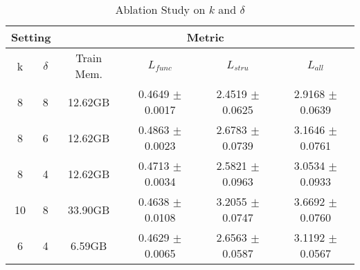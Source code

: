 \begin{table}[h]
\centering
\caption{Ablation Study on $k$ and $\delta$}
\begin{tabular}{@{}cc|cccc@{}}
\toprule
\multicolumn{2}{c|}{Setting} & \multicolumn{4}{c}{Metric} \\ \midrule
k & $\delta$ & Train Mem. & $L_{func}$ & $L_{stru}$ & $L_{all}$ \\ \midrule
8 & 8 & 12.62GB & 0.4649 $\pm$ 0.0017 & 2.4519 $\pm$ 0.0625 & 2.9168 $\pm$ 0.0639 \\
8 & 6 & 12.62GB & 0.4863 $\pm$ 0.0023 & 2.6783 $\pm$ 0.0739 & 3.1646 $\pm$ 0.0761 \\
8 & 4 & 12.62GB & 0.4713 $\pm$ 0.0034 & 2.5821 $\pm$ 0.0963 & 3.0534 $\pm$ 0.0933 \\
10 & 8 & 33.90GB & 0.4638 $\pm$ 0.0108 & 3.2055 $\pm$ 0.0747 & 3.6692 $\pm$ 0.0760 \\
6 & 4 & 6.59GB & 0.4629 $\pm$ 0.0065 & 2.6563 $\pm$ 0.0587 & 3.1192 $\pm$ 0.0567 \\ \bottomrule
\end{tabular}
\label{tab:ablation_kd}
\end{table}


